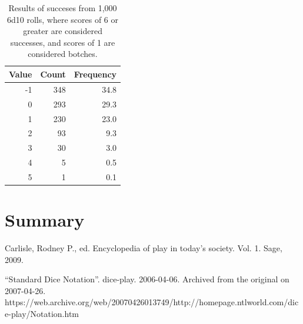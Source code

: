 \documentclass[twocolumn,letterpaper]{article}  %
\begin{document}
\begin{table}[h!]
\begin{center}
\begin{tabular}{*{3}{r}}
\toprule
Value & Count & Frequency \\
\midrule
 -1   & 348      & 34.8 \\
  0   & 293      & 29.3 \\
  1   & 230      & 23.0 \\
  2   &  93      &  9.3 \\
  3   &  30      &  3.0 \\
  4   &   5      &  0.5 \\
  5   &   1      &  0.1 \\
\bottomrule
\end{tabular}
\end{center}
\caption{Results of succeses from 1,000 6d10 rolls, where scores of 6 or greater are considered successes, and scores of 1 are considered botches.}
\end{table}

\section{Summary}



%
\begin{thebibliography}{1}

Carlisle, Rodney P., ed. Encyclopedia of play in today's society. Vol. 1. Sage, 2009.

``Standard Dice Notation''. dice-play. 2006-04-06. Archived from the original on 2007-04-26. https://web.archive.org/web/20070426013749/http://homepage.ntlworld.com/dice-play/Notation.htm

\end{thebibliography}

\clearpage
\onecolumn
\appendix{}               %
\end{document}
